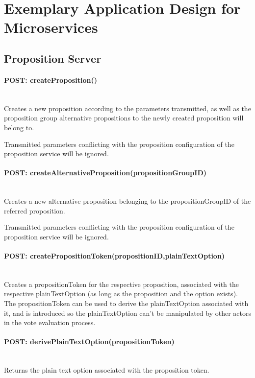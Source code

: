 \section{Exemplary Application Design for Microservices}
\label{sec:ApplicationDesign}

 \subsection{Proposition Server}

 \paragraph*{POST: createProposition()} \mbox{} \\
 Creates a new proposition according to the parameters transmitted, as well as the proposition group alternative propositions to the newly created proposition will belong to.

 Transmitted parameters conflicting with the proposition configuration of the proposition service will be ignored.

 \paragraph*{POST: createAlternativeProposition(propositionGroupID)} \mbox{} \\
 Creates a new alternative proposition belonging to the propositionGroupID of the referred proposition.

 Transmitted parameters conflicting with the proposition configuration of the proposition service will be ignored.

 \paragraph*{POST: createPropositionToken(propositionID,plainTextOption)} \mbox{} \\
 Creates a propositionToken for the respective proposition, associated with the respective plainTextOption (as long as the proposition and the option exists). The propositionToken can be used to derive the plainTextOption associated with it, and is introduced so the plainTextOption can't be manipulated by other actors in the vote evaluation process.

 \paragraph*{POST: derivePlainTextOption(propositionToken)} \mbox{} \\
 Returns the plain text option associated with the proposition token.


